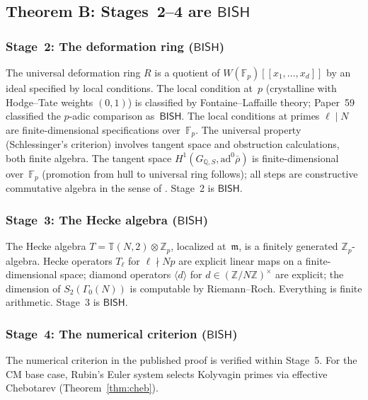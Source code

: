 \documentclass[11pt]{article}
\theoremstyle{plain}
\theoremstyle{definition}
\theoremstyle{remark}
\newcommand{\Z}{\mathbb{Z}}
\newcommand{\Q}{\mathbb{Q}}
\newcommand{\F}{\mathbb{F}}
\newcommand{\fm}{\mathfrak{m}}
\newcommand{\BISH}{\mathsf{BISH}}
\begin{document}
\subsection{Theorem B: Stages~2--4 are \texorpdfstring{$\BISH$}{BISH}}\label{sec:alg}

\subsubsection{Stage~2: The deformation ring (\texorpdfstring{$\BISH$}{BISH})}

The universal deformation ring $R$ is a quotient of
$W(\F_p)[[x_1, \ldots, x_d]]$ by an ideal specified by local
conditions.  The local condition at~$p$ (crystalline with
Hodge--Tate weights $(0,1)$) is classified by Fontaine--Laffaille
theory; Paper~59 \cite{Paper59} classified the $p$-adic comparison
as~$\BISH$.  The local conditions at primes $\ell \mid N$ are
finite-dimensional specifications over~$\F_p$.  The universal
property (Schlessinger's criterion) involves tangent space and
obstruction calculations, both finite algebra.  The tangent space
$H^1(G_{\Q,S}, \mathrm{ad}^0\bar{\rho})$ is finite-dimensional
over~$\F_p$ (promotion from hull to universal ring follows); all
steps are constructive commutative algebra in the sense of
\cite{MRR1988}.  Stage~2 is $\BISH$.

\subsubsection{Stage~3: The Hecke algebra (\texorpdfstring{$\BISH$}{BISH})}

The Hecke algebra $T = \mathbb{T}(N, 2) \otimes \Z_p$, localized
at~$\fm$, is a finitely generated $\Z_p$-algebra.
Hecke operators $T_\ell$ for $\ell \nmid Np$ are explicit linear
maps on a finite-dimensional space; diamond operators
$\langle d \rangle$ for $d \in (\Z/N\Z)^\times$ are explicit;
the dimension of $S_2(\Gamma_0(N))$ is computable by
Riemann--Roch.  Everything is finite arithmetic.  Stage~3 is $\BISH$.

\subsubsection{Stage~4: The numerical criterion (\texorpdfstring{$\BISH$}{BISH})}\label{sec:stage4cm}

The numerical criterion in the published proof is verified within
Stage~5.  For the CM base case, Rubin's Euler system \cite{Rubin1991}
selects Kolyvagin primes via effective Chebotarev
(Theorem~\ref{thm:cheb}).
\end{document}

